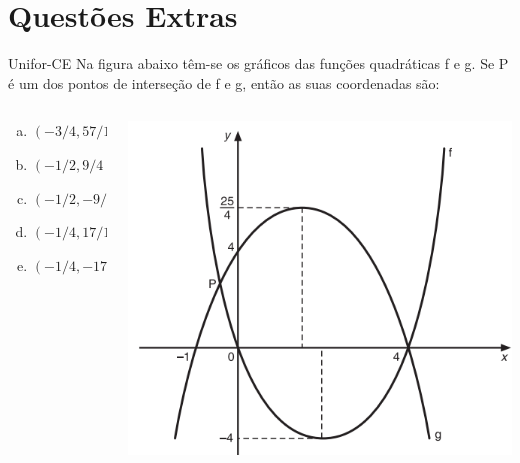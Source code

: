 \documentclass[11pt]{beamer}
\begin{document}
\section{Questões Extras}
\begin{frame}{Unifor-CE}
    Na figura abaixo têm-se os gráficos das funções quadráticas f e g. Se P é um dos pontos de interseção de f e g, então as suas coordenadas são:

    \begin{columns}
        \begin{column}{0.4\textwidth}
            \begin{enumerate}[a)]
                \item $(-{3}/{4},{57}/{16})$ 
                \item $(-{1}/{2},{9}/{4})$  %
                \item $(-{1}/{2},-{9}/{4})$
                \item $(-{1}/{4},{17}/{16})$ 
                \item $(-{1}/{4},-{17}/{16})$
            \end{enumerate}
        \end{column}

        \begin{column}{0.6\textwidth}
            \centering
            \includegraphics[width=0.9\linewidth]{imagens/Unifor-CE.png}
        \end{column}
    \end{columns}
    
\end{frame}
\end{document}
